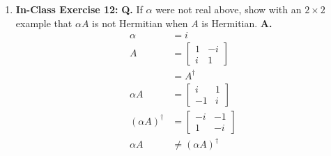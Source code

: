 \documentclass[main.tex]{subfiles}
\begin{document}
\begin{enumerate}
\item[] \textbf{In-Class Exercise 12:} \textbf{Q.} If $\alpha$ were not real above, show with an $2 \times 2$ example that $\alpha A$ is not Hermitian when $A$ is Hermitian. \textbf{A.}
    \begin{align*}
        \alpha                  & = i\\
        A                       & = \left[\begin{array}{cc}1 & -i \\ i & 1\end{array}\right]\\
                                & = A^{\dagger}\\ 
        \alpha A                & = \left[\begin{array}{cc}i & 1 \\ -1 & i\end{array}\right]\\
        (\alpha A)^{\dagger}    & = \left[\begin{array}{cc}-i & -1 \\ 1 & -i\end{array}\right]\\
        \alpha A                & \neq (\alpha A)^{\dagger}
    \end{align*}


\end{enumerate}
\end{document}
